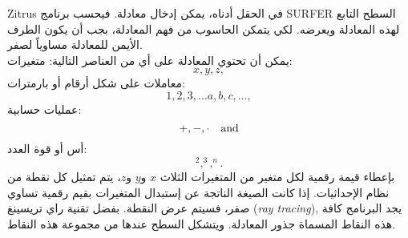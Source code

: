\begin{surferPage}{Zitrus}
في الحقل أدناه، يمكن إدخال معادلة. فيحسب برنامج SURFER السطح التابع لهذه المعادلة ويعرضه. لكي يتمكن الحاسوب من فهم المعادلة، بجب أن يكون الطرف الأيمن للمعادلة مساوياً لصفر.
\\
يمكن أن تحتوي المعادلة على أي من العناصر التالية:
\newline
متغيرات:
\[x, y, z, \]
معاملات على شكل أرقام أو بارمترات:
\[1, 2, 3, \dots a, b, c, \dots, \]
عمليات حسابية:
\[+,  - , \cdot \quad \textnormal{and} \]
أس أو قوة العدد:
\[ ^2, ^3, ^n .\]
بإعطاء قيمة رقمية لكل متغير من المتغيرات الثلاث $x$ و$y$ و$z$، يتم تمثيل كل نقطة من نظام الإحداثيات. إذا كانت الصيغة الناتجة عن إستبدال المتغيرات بقيم رقمية تساوي صفر، فسيتم عرض النقطة. بفضل تقنية راي تريسينغ 
\textenglish{(\textit{ray tracing})},
يجد البرنامج كافة هذه النقاط المسماة جذور المعادلة. ويتشكل السطح عندها من مجموعة هذه النقاط.
\end{surferPage}
